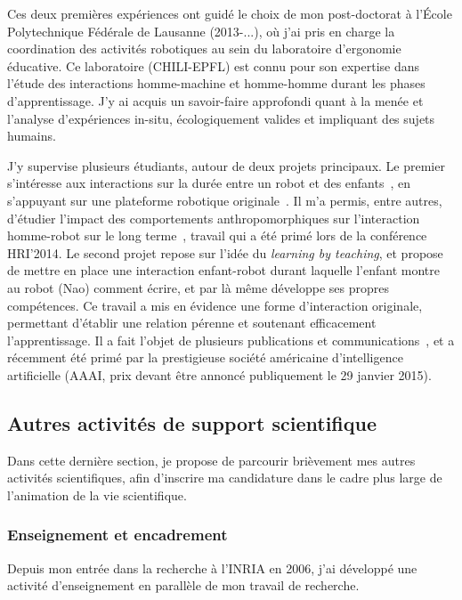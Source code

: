 \documentclass[a4paper]{article}
\begin{document}
Ces deux premières expériences ont guidé le choix de mon post-doctorat à l'École
Polytechnique Fédérale de Lausanne (2013-...), où j'ai pris en charge la
coordination des activités robotiques au sein du laboratoire d'ergonomie
éducative. Ce laboratoire (CHILI-EPFL) est connu pour son expertise dans l'étude
des interactions homme-machine et homme-homme durant les phases d'apprentissage.
J'y ai acquis un savoir-faire approfondi quant à la menée et l'analyse d'expériences
in-situ, écologiquement valides et impliquant des sujets humains.

J'y supervise plusieurs étudiants, autour de deux projets principaux. Le
premier s'intéresse aux interactions sur la durée entre un robot et des
enfants~\cite{fink2014which}, en s'appuyant sur une plateforme robotique
originale~\cite{mondada2014ranger}. Il m'a permis, entre autres, d'étudier
l'impact des comportements anthropomorphiques sur l'interaction homme-robot sur
le long terme~\cite{lemaignan2014dynamics,lemaignan2014cognitive}, travail qui a
été primé lors de la conférence HRI'2014. Le second projet repose sur l'idée du
\emph{learning by teaching}, et propose de mettre en place une interaction
enfant-robot durant laquelle l'enfant montre au robot (Nao) comment
écrire, et par là même développe ses propres compétences. Ce travail a mis en évidence
une forme d'interaction originale, permettant d'établir une relation pérenne et
soutenant efficacement l'apprentissage. Il a fait l'objet de plusieurs
publications et
communications~\cite{hood2015when,lemaignan2014taught,hood2015cowriter}, et a
récemment été primé par la prestigieuse société américaine d'intelligence
artificielle (AAAI, prix devant être annoncé publiquement le 29 janvier 2015).

\subsection*{Autres activités de support scientifique}

Dans cette dernière section, je propose de parcourir brièvement mes autres
activités scientifiques, afin d'inscrire ma candidature dans le cadre plus large
de l'animation de la vie scientifique.

\subsubsection*{Enseignement et encadrement}

Depuis mon entrée dans la recherche à l'INRIA en 2006, j'ai développé une
activité d'enseignement en parallèle de mon travail de recherche.
\end{document}

